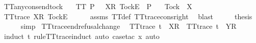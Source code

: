 {\isafoldproof}%
%
\isadelimproof
\isanewline
%
\endisadelimproof
\isanewline
{}\isamarkupfalse%
\ TT{}{\isacharunderscore}any{\isacharunderscore}cons{\isacharunderscore}end{\isacharunderscore}tock{\isacharcolon}\isanewline
\ \ \ {\isachardoublequoteopen}TT{}\ P{\isachardoublequoteclose}\ {\isachardoublequoteopen}{\isasymrho}\ {\isacharat}\ {\isacharbrackleft}{\isacharbrackleft}X{\isacharbrackright}\isactrlsub R{\isacharcomma}\ {\isacharbrackleft}Tock{\isacharbrackright}\isactrlsub E{\isacharbrackright}\ {\isasymin}\ P{\isachardoublequoteclose}\isanewline
\ \ \ {\isachardoublequoteopen}Tock\ {\isasymnotin}\ X{\isachardoublequoteclose}\isanewline
%
\isadelimproof
%
\endisadelimproof
%
\isatagproof
{}\isamarkupfalse%
\ {\isacharminus}\isanewline
\ \ \isamarkupfalse%
\ {\isachardoublequoteopen}TT{}{\isacharunderscore}trace\ {\isacharparenleft}{\isacharbrackleft}{\isacharbrackleft}X{\isacharbrackright}\isactrlsub R{\isacharcomma}\ {\isacharbrackleft}Tock{\isacharbrackright}\isactrlsub E{\isacharbrackright}{\isacharparenright}{\isachardoublequoteclose}\isanewline
\ \ \ \ \isamarkupfalse%
\ assms\ TT{}{\isacharunderscore}def\ TT{}{\isacharunderscore}trace{\isacharunderscore}cons{\isacharunderscore}right\ \isamarkupfalse%
\ blast\isanewline
\ \ \isamarkupfalse%
\ \isamarkupfalse%
\ {\isacharquery}thesis\isanewline
\ \ \ \ \isamarkupfalse%
\ simp\isanewline
{}\isamarkupfalse%
%
\endisatagproof
{\isafoldproof}%
%
\isadelimproof
\isanewline
%
\endisadelimproof
\isanewline
{}\isamarkupfalse%
\ TT{}{\isacharunderscore}trace{\isacharunderscore}end{\isacharunderscore}refusal{\isacharunderscore}change{\isacharcolon}\isanewline
\ \ {\isachardoublequoteopen}TT{}{\isacharunderscore}trace\ {\isacharparenleft}t\ {\isacharat}\ {\isacharbrackleft}{\isacharbrackleft}X{\isacharbrackright}\isactrlsub R{\isacharbrackright}{\isacharparenright}\ {\isasymLongrightarrow}\ TT{}{\isacharunderscore}trace\ {\isacharparenleft}t\ {\isacharat}\ {\isacharbrackleft}{\isacharbrackleft}Y{\isacharbrackright}\isactrlsub R{\isacharbrackright}{\isacharparenright}{\isachardoublequoteclose}\isanewline
%
\isadelimproof
\ \ %
\endisadelimproof
%
\isatagproof
{}\isamarkupfalse%
\ {\isacharparenleft}induct\ t\ rule{\isacharcolon}TT{}{\isacharunderscore}trace{\isachardot}induct{\isacharcomma}\ auto{\isacharcomma}\ case{\isacharunderscore}tac\ x{\isacharcomma}\ auto{\isacharparenright}%
